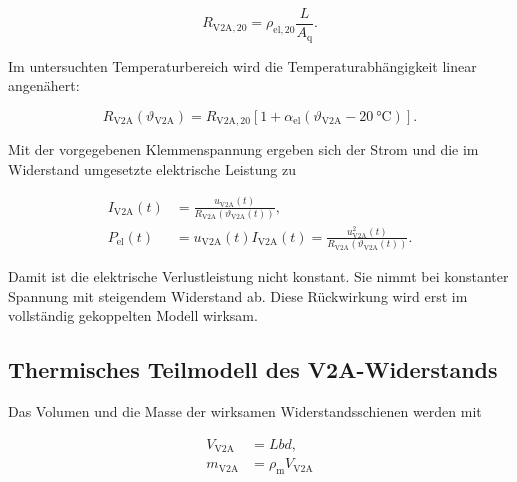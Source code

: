 \begin{equation}
    R_{\mathrm{V2A},20}
    =
    \rho_{\mathrm{el},20}\frac{L}{A_{\mathrm{q}}}.
    \label{eq:modell_widerstand_20}
\end{equation}

Im untersuchten Temperaturbereich wird die Temperaturabhängigkeit linear
angenähert:

\begin{equation}
    R_{\mathrm{V2A}}\!\left(\vartheta_{\mathrm{V2A}}\right)
    =
    R_{\mathrm{V2A},20}
    \left[
        1+\alpha_{\mathrm{el}}
        \left(\vartheta_{\mathrm{V2A}}-\SI{20}{\degreeCelsius}\right)
    \right].
    \label{eq:modell_widerstand_temperatur}
\end{equation}

Mit der vorgegebenen Klemmenspannung ergeben sich der Strom und die im
Widerstand umgesetzte elektrische Leistung zu

\begin{align}
    I_{\mathrm{V2A}}(t)
    &=
    \frac{u_{\mathrm{V2A}}(t)}
         {R_{\mathrm{V2A}}\!\left(\vartheta_{\mathrm{V2A}}(t)\right)},
    \label{eq:modell_strom}\\
    P_{\mathrm{el}}(t)
    &=
    u_{\mathrm{V2A}}(t)I_{\mathrm{V2A}}(t)
     =
    \frac{u_{\mathrm{V2A}}^{2}(t)}
         {R_{\mathrm{V2A}}\!\left(\vartheta_{\mathrm{V2A}}(t)\right)}.
    \label{eq:modell_verlustleistung}
\end{align}

Damit ist die elektrische Verlustleistung nicht konstant. Sie nimmt bei
konstanter Spannung mit steigendem Widerstand ab. Diese Rückwirkung wird erst
im vollständig gekoppelten Modell wirksam.


\subsection{Thermisches Teilmodell des V2A-Widerstands}
\label{sec:thermisches_teilmodell}

Das Volumen und die Masse der wirksamen Widerstandsschienen werden mit

\begin{align}
    V_{\mathrm{V2A}} &= Lbd,
    \label{eq:modell_volumen}\\
    m_{\mathrm{V2A}} &= \rho_{\mathrm{m}}V_{\mathrm{V2A}}
    \label{eq:modell_masse}
\end{align}

